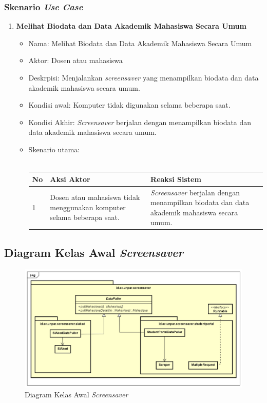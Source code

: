 \subsubsection{Skenario \textit{Use Case}}
\begin{enumerate}
	\item \textbf{Melihat Biodata dan Data Akademik Mahasiswa Secara Umum}
	\begin{itemize}
		\item Nama: Melihat Biodata dan Data Akademik Mahasiswa Secara Umum
		\item Aktor: Dosen atau mahasiswa
		\item Deskrpisi: Menjalankan \textit{screensaver} yang menampilkan biodata dan data akademik mahasiswa secara umum.
		\item Kondisi awal: Komputer tidak digunakan selama beberapa saat.
		\item Kondisi Akhir: \textit{Screensaver} berjalan dengan menampilkan biodata dan data akademik mahasiswa secara umum.
		\item Skenario utama: \\ \\
			\begin{tabular}{|p{0.5cm} |p{6cm}| p{6cm}|}
					\hline
						No 	& Aksi Aktor & Reaksi Sistem \\ \hline
						1 	& Dosen atau mahasiswa tidak menggunakan komputer selama beberapa saat. 	&	\textit{Screensaver} berjalan dengan menampilkan biodata dan data akademik mahasiswa secara umum. \\ \hline 
					\end{tabular}
	\end{itemize}
\end{enumerate}


\subsection{Diagram Kelas Awal \textit{Screensaver}}

\begin{figure}[H]
	\centering
	\includegraphics[scale=0.45]{Gambar/ClassDiagramAwal.png}
	\caption{Diagram Kelas Awal \textit{Screensaver}}
	\label{fig:3_diagram_kelas_awal}
\end{figure}


